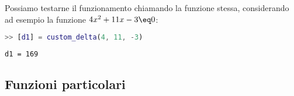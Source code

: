 Possiamo testarne il funzionamento chiamando la funzione stessa, considerando ad esempio la funzione $4x^2 + 11x - 3 \eq 0$:

\begin{terminal}
    \begin{lstlisting}[language=MATLAB, style=notexterm]
>> [d1] = custom_delta(4, 11, -3)\end{lstlisting}
    \tcblower
    \begin{lstlisting}[style=notexterm, language = tex]
d1 = 169\end{lstlisting}
\end{terminal}

\subsection{Funzioni particolari}

